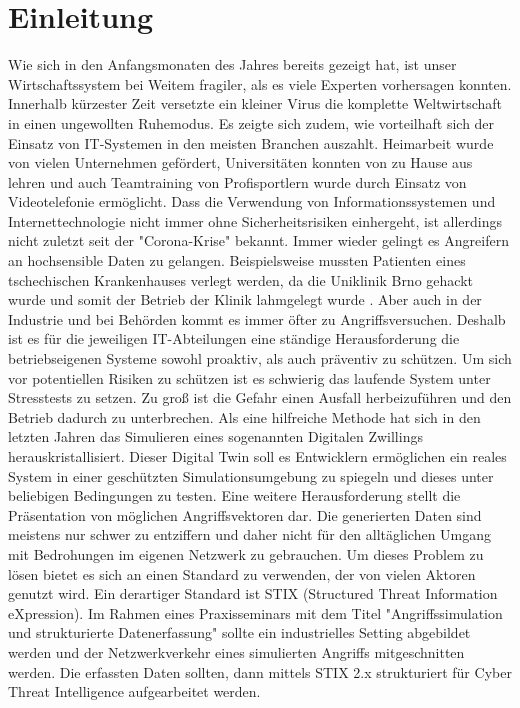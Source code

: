 
\chapter{Einleitung}
\label{chap:Einleitung}


Wie sich in den Anfangsmonaten des Jahres bereits gezeigt hat, ist unser Wirtschaftssystem bei Weitem fragiler, als es viele Experten vorhersagen konnten. Innerhalb kürzester Zeit versetzte ein kleiner Virus die komplette Weltwirtschaft in einen ungewollten Ruhemodus.
Es zeigte sich zudem, wie vorteilhaft sich der Einsatz von IT-Systemen in den meisten Branchen auszahlt. Heimarbeit wurde von vielen Unternehmen gefördert, Universitäten konnten von zu Hause aus lehren und auch Teamtraining von Profisportlern wurde durch Einsatz von Videotelefonie ermöglicht. \newline
Dass die Verwendung von Informationssystemen und Internettechnologie nicht immer ohne Sicherheitsrisiken einhergeht, ist allerdings nicht zuletzt seit der "Corona-Krise" bekannt. Immer wieder gelingt es Angreifern an hochsensible Daten zu gelangen. Beispielsweise mussten Patienten eines tschechischen Krankenhauses verlegt werden, da die Uniklinik Brno gehackt wurde und somit der Betrieb der Klinik lahmgelegt wurde \cite{Holland2020}. Aber auch in der Industrie und bei Behörden kommt es immer öfter zu Angriffsversuchen.
Deshalb ist es für die jeweiligen IT-Abteilungen eine ständige Herausforderung die betriebseigenen Systeme sowohl proaktiv, als auch präventiv zu schützen.    \newline Um sich vor potentiellen Risiken zu schützen ist es schwierig das laufende System unter Stresstests zu setzen. Zu groß ist die Gefahr einen Ausfall herbeizuführen und den Betrieb dadurch zu unterbrechen. Als eine hilfreiche Methode hat sich in den letzten Jahren das Simulieren eines sogenannten Digitalen Zwillings herauskristallisiert. Dieser Digital Twin soll es Entwicklern ermöglichen ein reales System in einer geschützten Simulationsumgebung zu spiegeln und dieses unter beliebigen Bedingungen zu testen. \newline Eine weitere Herausforderung stellt die Präsentation von möglichen Angriffsvektoren dar. Die generierten Daten sind meistens nur schwer zu entziffern und daher nicht für den alltäglichen Umgang mit Bedrohungen im eigenen Netzwerk zu gebrauchen. Um dieses Problem zu lösen bietet es sich an einen Standard zu verwenden, der von vielen Aktoren genutzt wird. Ein derartiger Standard ist STIX (Structured Threat Information eXpression). \newline Im Rahmen eines Praxisseminars mit dem Titel "Angriffssimulation und strukturierte Datenerfassung" sollte ein industrielles Setting abgebildet werden und der Netzwerkverkehr eines simulierten Angriffs mitgeschnitten werden. Die erfassten Daten sollten, dann mittels STIX 2.x strukturiert für Cyber Threat Intelligence aufgearbeitet werden. 




